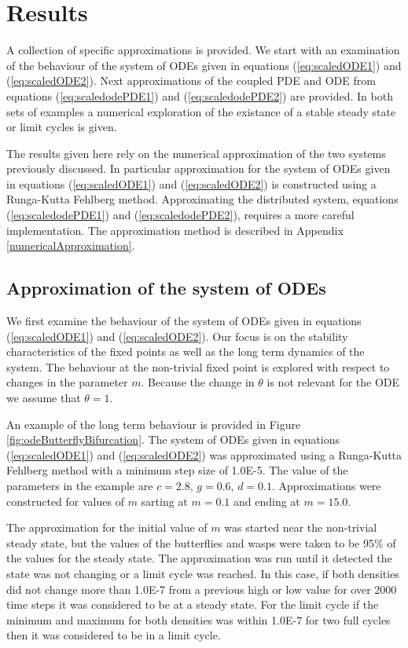 \documentclass[review]{elsarticle}
\begin{document}
\section{Results}
\label{section:results}

A collection of specific approximations is provided. We start with an
examination of the behaviour of the system of ODEs given in equations
(\ref{eq:scaledODE1}) and (\ref{eq:scaledODE2}). Next approximations
of the coupled PDE and ODE from equations (\ref{eq:scaledodePDE1}) and
(\ref{eq:scaledodePDE2}) are provided. In both sets of examples a
numerical exploration of the existance of a stable steady state or
limit cycles is given.

The results given here rely on the numerical approximation of the two
systems previously discussed. In particular approximation for the
system of ODEs given in equations (\ref{eq:scaledODE1}) and
(\ref{eq:scaledODE2}) is constructed using a Runga-Kutta Fehlberg
method. Approximating the distributed system, equations
(\ref{eq:scaledodePDE1}) and (\ref{eq:scaledodePDE2}), requires a more
careful implementation. The approximation method is described in
Appendix \ref{numericalApproximation}.

\subsection{Approximation of the system of ODEs}
\label{subsection:odeApproximation}

We first examine the behaviour of the system of ODEs given in
equations (\ref{eq:scaledODE1}) and (\ref{eq:scaledODE2}). Our focus
is on the stability characteristics of the fixed points as well as the
long term dynamics of the system. The behaviour at the non-trivial
fixed point is explored with respect to changes in the parameter
$m$. Because the change in $\theta$ is not relevant for the ODE we
assume that $\theta=1$.

An example of the long term behaviour is provided in Figure
\ref{fig:odeButterflyBifurcation}. The system of ODEs given in
equations (\ref{eq:scaledODE1}) and (\ref{eq:scaledODE2}) was
approximated using a Runga-Kutta Fehlberg method with a minimum step
size of 1.0E-5.  The value of the parameters in the example are
$c=2.8$, $g=0.6$, $d=0.1$. Approximations were constructed for values
of $m$ sarting at $m=0.1$ and ending at $m=15.0$.

The approximation for the initial value of $m$ was started near the
non-trivial steady state, but the values of the butterflies and wasps
were taken to be 95\% of the values for the steady state. The
approximation was run until it detected the state was not changing or
a limit cycle was reached. In this case, if both densities did not
change more than 1.0E-7 from a previous high or low value for over
2000 time steps it was considered to be at a steady state. For the
limit cycle if the minimum and maximum for both densities was within
1.0E-7 for two full cycles then it was considered to be in a limit
cycle.
\end{document}

